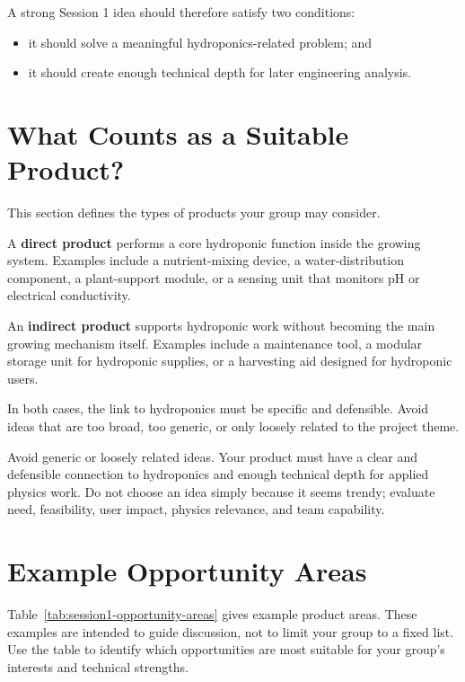A strong Session 1 idea should therefore satisfy two conditions:
\begin{itemize}
    \item it should solve a meaningful hydroponics-related problem; and
    \item it should create enough technical depth for later engineering analysis.
\end{itemize}

\section{What Counts as a Suitable Product?}

This section defines the types of products your group may consider.

A \textbf{direct product} performs a core hydroponic function inside the growing system. Examples include a nutrient-mixing device, a water-distribution component, a plant-support module, or a sensing unit that monitors pH or electrical conductivity.

An \textbf{indirect product} supports hydroponic work without becoming the main growing mechanism itself. Examples include a maintenance tool, a modular storage unit for hydroponic supplies, or a harvesting aid designed for hydroponic users.

In both cases, the link to hydroponics must be specific and defensible. Avoid ideas that are too broad, too generic, or only loosely related to the project theme.

\begin{tcolorbox}[title=Common Mistakes]
Avoid generic or loosely related ideas. Your product must have a clear and defensible connection to hydroponics and enough technical depth for applied physics work. Do not choose an idea simply because it seems trendy; evaluate need, feasibility, user impact, physics relevance, and team capability.
\end{tcolorbox}

\section{Example Opportunity Areas}

Table~\ref{tab:session1-opportunity-areas} gives example product areas. These examples are intended to guide discussion, not to limit your group to a fixed list. Use the table to identify which opportunities are most suitable for your group's interests and technical strengths.


